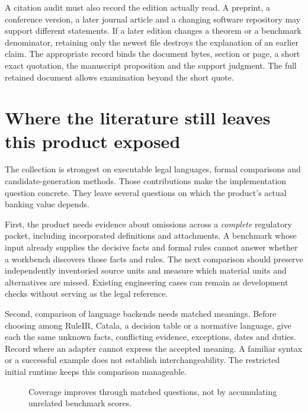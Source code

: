 A citation audit must also record the edition actually read. A preprint, a
conference version, a later journal article and a changing software repository
may support different statements. If a later edition changes a theorem or a
benchmark denominator, retaining only the newest file destroys the explanation
of an earlier claim. The appropriate record binds the document bytes, section or
page, a short exact quotation, the manuscript proposition and the support
judgment. The full retained document allows examination beyond the short quote.

\section{Where the literature still leaves this product exposed}
\label{sec:remaining-literature-gaps}

The collection is strongest on executable legal languages, formal comparisons
and candidate-generation methods. Those contributions make the implementation
question concrete. They leave several questions on which the product's actual
banking value depends.

First, the product needs evidence about omissions across a \emph{complete}
regulatory packet, including incorporated definitions and attachments. A
benchmark whose input already supplies the decisive facts and formal rules
cannot answer whether a workbench discovers those facts and rules. The next
comparison should preserve independently inventoried source units and measure
which material units and alternatives are missed. Existing engineering cases
can remain as development checks without serving as the legal reference.

Second, comparison of language backends needs matched meanings. Before choosing
among RuleIR, Catala, a decision table or a normative language, give each the same
unknown facts, conflicting evidence, exceptions, dates and duties. Record where
an adapter cannot express the accepted meaning. A familiar syntax or a successful
example does not establish interchangeability. The restricted initial runtime
keeps this comparison manageable.

\begin{figure}[H]
\centering
{}
\caption{Coverage improves through matched questions, not by accumulating unrelated benchmark scores.}
\label{fig:literature-matched-question}
\end{figure}

